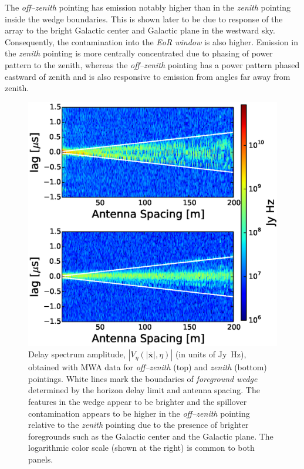 \documentclass[preprint2,iop,numberedappendix]{emulateapj}
\begin{document}
 The {\it off--zenith} pointing has emission notably higher than in the {\it zenith} pointing inside the wedge boundaries. This is shown later to be due to response of the array to the bright Galactic center and Galactic plane in the westward sky. Consequently, the contamination into the {\it EoR window} is also higher. Emission in the {\it zenith} pointing is more centrally concentrated due to phasing of power pattern to the zenith, whereas the {\it off--zenith} pointing has a power pattern phased eastward of zenith and is also responsive to emission from angles far away from zenith. 

\begin{figure}[htb]
\centering
\includegraphics[width=\linewidth]{figures/v1_0/multi_baseline_fhd_delay_spectrum_snapshots.eps}
\caption{Delay spectrum amplitude, $|V_\eta(|\overline{\mathbf{x}}|,\eta)|$ (in units of Jy~Hz), obtained with MWA data for {\it off--zenith} (top) and {\it zenith} (bottom) pointings. White lines mark the boundaries of {\it foreground wedge} determined by the horizon delay limit and antenna spacing. The features in the wedge appear to be brighter and the spillover contamination appears to be higher in the {\it off--zenith} pointing relative to the {\it zenith} pointing due to the presence of brighter foregrounds such as the Galactic center and the Galactic plane. The logarithmic color scale (shown at the right) is common to both panels.\label{fig:fhd_data}}
\end{figure}
\end{document}
